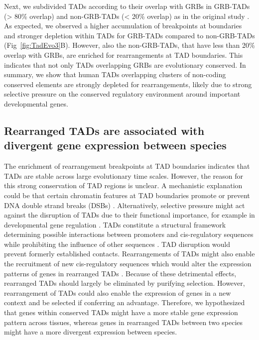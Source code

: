 \documentclass[a4paper,twoside=true,openright,parskip=full,chapterprefix=true,11pt,headings=normal,bibliography=totoc,listof=totoc,titlepage=on,captions=tableabove,draft=false]{scrreprt}
\theoremstyle{definition}
\theoremstyle{definition}
\theoremstyle{definition}
\theoremstyle{remark}
\begin{document}
Next, we subdivided TADs according to their overlap with GRBs in
GRB-TADs (\textgreater{} 80\% overlap) and non-GRB-TADs (\textless{}
20\% overlap) as in the original study \citep{Harmston2017}. As
expected, we observed a higher accumulation of breakpoints at boundaries
and stronger depletion within TADs for GRB-TADs compared to non-GRB-TADs
(Fig~\ref{fig:TadEvo3}B). However, also the non-GRB-TADs, that have less
than 20\% overlap with GRBs, are enriched for rearrangements at TAD
boundaries. This indicates that not only TADs overlapping GRBs are
evolutionary conserved. In summary, we show that human TADs overlapping
clusters of non-coding conserved elements are strongly depleted for
rearrangements, likely due to strong selective pressure on the conserved
regulatory environment around important developmental genes.

\hypertarget{rearranged-tads-are-associated-with-divergent-gene-expression-between-species}{%
\subsection{Rearranged TADs are associated with divergent gene
expression between
species}\label{rearranged-tads-are-associated-with-divergent-gene-expression-between-species}}

The enrichment of rearrangement breakpoints at TAD boundaries indicates
that TADs are stable across large evolutionary time scales. However, the
reason for this strong conservation of TAD regions is unclear. A
mechanistic explanation could be that certain chromatin features at TAD
boundaries promote or prevent DNA double strand breaks (DSBs)
\citep{Farre2015, Canela2017}. Alternatively, selective pressure might
act against the disruption of TADs due to their functional importance,
for example in developmental gene regulation
\citep{Nora2013, Farre2015}. TADs constitute a structural framework
determining possible interactions between promoters and cis-regulatory
sequences while prohibiting the influence of other sequences
\citep{Symmons2014, Lupianez2015}. TAD disruption would prevent formerly
established contacts. Rearrangements of TADs might also enable the
recruitment of new cis-regulatory sequences which would alter the
expression patterns of genes in rearranged TADs
\citep{Lupianez2015, Redin2017}. Because of these detrimental effects,
rearranged TADs should largely be eliminated by purifying selection.
However, rearrangement of TADs could also enable the expression of genes
in a new context and be selected if conferring an advantage. Therefore,
we hypothesized that genes within conserved TADs might have a more
stable gene expression pattern across tissues, whereas genes in
rearranged TADs between two species might have a more divergent
expression between species.
\end{document}
